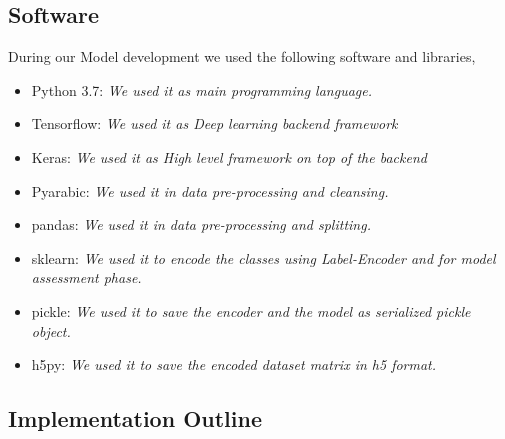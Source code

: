 \subsection{Software}

During our Model development we used the following software and libraries,

\begin{itemize}
  \item Python 3.7: \textit{We used it as main programming language.}
  \item Tensorflow: \textit{We used it as Deep learning backend framework}
  \item Keras: \textit{We used it as High level framework on top of the backend}
  \item Pyarabic: \textit{We used it in data pre-processing and cleansing.}
  \item pandas: \textit{We used it in data pre-processing and splitting.}
  \item sklearn: \textit{We used it to encode the classes using Label-Encoder and for model assessment phase.}
  \item pickle: \textit{We used it to save the encoder and the model as serialized pickle object.}
  \item h5py: \textit{We used it to save the encoded dataset matrix in h5 format.}
\end{itemize}

\subsection{Implementation Outline}

